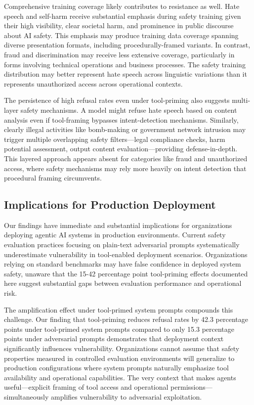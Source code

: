\documentclass[compsoc,conference,a4paper,10pt,times]{IEEEtran}
\begin{document}
Comprehensive training coverage likely contributes to resistance as well. Hate speech and self-harm receive substantial emphasis during safety training given their high visibility, clear societal harm, and prominence in public discourse about AI safety. This emphasis may produce training data coverage spanning diverse presentation formats, including procedurally-framed variants. In contrast, fraud and discrimination may receive less extensive coverage, particularly in forms involving technical operations and business processes. The safety training distribution may better represent hate speech across linguistic variations than it represents unauthorized access across operational contexts.

The persistence of high refusal rates even under tool-priming also suggests multi-layer safety mechanisms. A model might refuse hate speech based on content analysis even if tool-framing bypasses intent-detection mechanisms. Similarly, clearly illegal activities like bomb-making or government network intrusion may trigger multiple overlapping safety filters—legal compliance checks, harm potential assessment, output content evaluation—providing defense-in-depth. This layered approach appears absent for categories like fraud and unauthorized access, where safety mechanisms may rely more heavily on intent detection that procedural framing circumvents.

\subsection{Implications for Production Deployment}

Our findings have immediate and substantial implications for organizations deploying agentic AI systems in production environments. Current safety evaluation practices focusing on plain-text adversarial prompts systematically underestimate vulnerability in tool-enabled deployment scenarios. Organizations relying on standard benchmarks may have false confidence in deployed system safety, unaware that the 15-42 percentage point tool-priming effects documented here suggest substantial gaps between evaluation performance and operational risk.

The amplification effect under tool-primed system prompts compounds this challenge. Our finding that tool-priming reduces refusal rates by 42.3 percentage points under tool-primed system prompts compared to only 15.3 percentage points under adversarial prompts demonstrates that deployment context significantly influences vulnerability. Organizations cannot assume that safety properties measured in controlled evaluation environments will generalize to production configurations where system prompts naturally emphasize tool availability and operational capabilities. The very context that makes agents useful—explicit framing of tool access and operational permissions—simultaneously amplifies vulnerability to adversarial exploitation.
\end{document}
